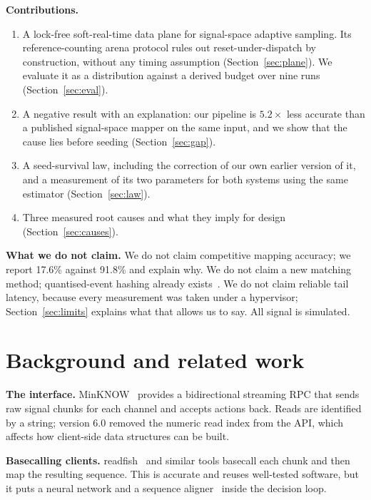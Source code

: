 \documentclass[conference]{IEEEtran}
\begin{document}
\textbf{Contributions.}
\begin{enumerate}
\item A lock-free soft-real-time data plane for signal-space adaptive sampling. Its
reference-counting arena protocol rules out reset-under-dispatch by construction, without any
timing assumption (Section~\ref{sec:plane}). We evaluate it as a distribution against a derived
budget over nine runs (Section~\ref{sec:eval}).
\item A negative result with an explanation: our pipeline is $5.2\times$ less accurate than a
published signal-space mapper on the same input, and we show that the cause lies before seeding
(Section~\ref{sec:gap}).
\item A seed-survival law, including the correction of our own earlier version of it, and a
measurement of its two parameters for both systems using the same estimator
(Section~\ref{sec:law}).
\item Three measured root causes and what they imply for design (Section~\ref{sec:causes}).
\end{enumerate}

\textbf{What we do not claim.} We do not claim competitive mapping accuracy; we report 17.6\%
against 91.8\% and explain why. We do not claim a new matching method; quantised-event hashing
already exists~\cite{rawhash,rawhash2}. We do not claim reliable tail latency, because every
measurement was taken under a hypervisor; Section~\ref{sec:limits} explains what that allows us
to say. All signal is simulated.

\section{Background and related work}

\textbf{The interface.} MinKNOW~\cite{minknow} provides a bidirectional streaming RPC that sends
raw signal chunks for each channel and accepts actions back. Reads are identified by a string;
version 6.0 removed the numeric read index from the API, which affects how client-side data
structures can be built.

\textbf{Basecalling clients.} readfish~\cite{readfish} and similar tools basecall each chunk and
then map the resulting sequence. This is accurate and reuses well-tested software, but it puts a
neural network and a sequence aligner~\cite{minimap2} inside the decision loop.
\end{document}
